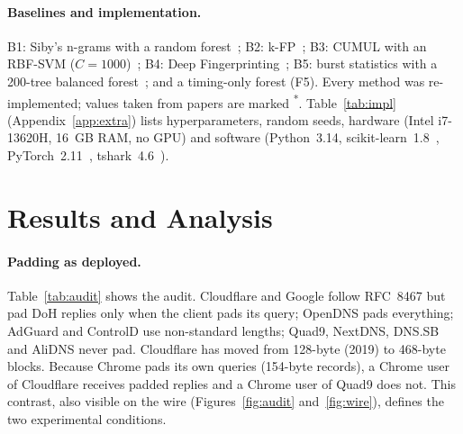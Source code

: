 \documentclass[pdflatex,sn-mathphys-num]{sn-jnl}
\newcommand{\pub}{\textsuperscript{*}}
\begin{document}
\paragraph{Baselines and implementation.} B1: Siby's n-grams with a random forest~\cite{siby2020}; B2: k-FP~\cite{hayes2016kfp}; B3: CUMUL with an RBF-SVM ($C=1000$)~\cite{panchenko2016cumul}; B4: Deep Fingerprinting~\cite{sirinam2018df}; B5: burst statistics with a 200-tree balanced forest~\cite{mouregarrido2026}; and a timing-only forest (F5). Every method was re-implemented; values taken from papers are marked \pub. Table~\ref{tab:impl} (Appendix~\ref{app:extra}) lists hyperparameters, random seeds, hardware (Intel i7-13620H, 16~GB RAM, no GPU) and software (Python~3.14, scikit-learn~1.8~\cite{pedregosa2011sklearn}, PyTorch~2.11~\cite{paszke2019pytorch}, tshark~4.6~\cite{wireshark}).

\section{Results and Analysis}\label{sec:results}

\paragraph{Padding as deployed.} Table~\ref{tab:audit} shows the audit. Cloudflare and Google follow RFC~8467 but pad DoH replies only when the client pads its query; OpenDNS pads everything; AdGuard and ControlD use non-standard lengths; Quad9, NextDNS, DNS.SB and AliDNS never pad. Cloudflare has moved from 128-byte (2019) to 468-byte blocks. Because Chrome pads its own queries (154-byte records), a Chrome user of Cloudflare receives padded replies and a Chrome user of Quad9 does not. This contrast, also visible on the wire (Figures~\ref{fig:audit} and~\ref{fig:wire}), defines the two experimental conditions.
\end{document}
